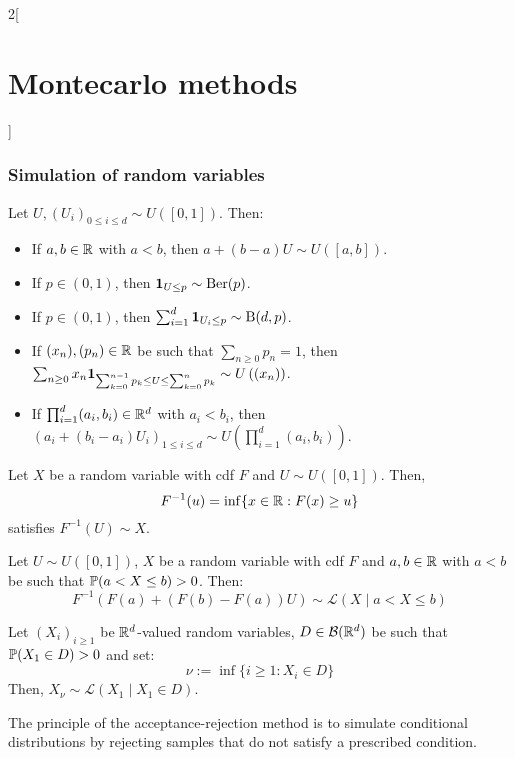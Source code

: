 \documentclass[../../../main_math.tex]{subfiles}
\begin{document}
\begin{multicols}{2}[\section{Montecarlo methods}]
  \subsubsection{Simulation of random variables}
  \begin{lemma}
    Let $U, {(U_i)}_{0\leq i\leq d}\sim U([0,1])$. Then:
    \begin{itemize}
      \item If $a,b\in\mathbb{R}$ with $a<b$, then $a+(b-a)U\sim U([a,b])$.
      \item If $p\in (0,1)$, then $\boldsymbol{\mathrm{1}}_{U\leq p}\sim\text{Ber}(p)$.
      \item If $p\in (0,1)$, then $\sum_{i=1}^d \boldsymbol{\mathrm{1}}_{U_i\leq p}\sim\text{B}(d,p)$.
      \item If $(x_n),(p_n)\in\mathbb{R}$ be such that $\sum_{n\geq 0} p_n=1$, then $\sum_{n\geq 0} x_n\boldsymbol{\mathrm{1}}_{\sum_{k=0}^{n-1} p_k\leq U\leq\sum_{k=0}^n p_k}\sim U\left((x_n)\right)$.
      \item If $\prod_{i=1}^d (a_i,b_i)\in \mathbb{R}^d$ with $a_i<b_i$, then $(a_i+(b_i-a_i)U_i)_{1\leq i\leq d}\sim U\left(\prod_{i=1}^d (a_i,b_i)\right)$.
    \end{itemize}
  \end{lemma}
  \begin{proposition}
    Let $X$ be a random variable with cdf $F$ and $U\sim U([0,1])$. Then,
    $$
      F^{-1}(u)=\inf\{ x\in\mathbb{R} : F(x)\geq u\}
    $$
    satisfies $F^{-1}(U)\sim X$.
  \end{proposition}
  \begin{proposition}
    Let $U\sim U([0,1])$, $X$ be a random variable with cdf $F$ and $a,b\in\mathbb{R}$ with $a<b$ be such that $\mathbb{P}(a< X\leq b)>0$. Then:
    $$
      F^{-1}\left(F(a)+(F(b)-F(a))U\right)\sim \mathcal{L}(X\mid a< X\leq b)
    $$
  \end{proposition}
  \begin{proposition}
    Let ${(X_i)}_{i\geq 1}$ be \iid $\mathbb{R}^d$-valued random variables, $D\in \mathcal{B}(\mathbb{R}^d)$ be such that $\mathbb{P}(X_1\in D)>0$ and set:
    $$
      \nu := \inf\{ i\geq 1 : X_i\in D\}
    $$
    Then, $X_\nu\sim \mathcal{L}(X_1\mid X_1\in D)$.
  \end{proposition}
  \begin{remark}
    The principle of the acceptance-rejection method is to simulate conditional distributions by rejecting samples that do not satisfy a prescribed condition.
  \end{remark}
  \begin{proposition}

\end{proposition}
\end{multicols}
\end{document}
